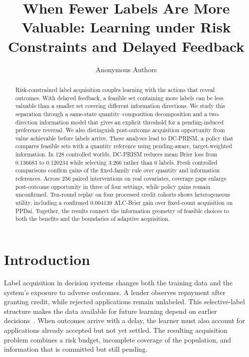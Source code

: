 \documentclass[runningheads]{llncs}
\begin{document}
\title{When Fewer Labels Are More Valuable: Learning under Risk Constraints and Delayed Feedback}
\author{Anonymous Authors}
\maketitle
\begin{abstract}
Risk-constrained label acquisition couples learning with the actions that reveal outcomes. With delayed feedback, a feasible set containing more labels can be less valuable than a smaller set covering different information directions. We study this separation through a same-state quantity--composition decomposition and a two-direction information model that gives an explicit threshold for a pending-induced preference reversal. We also distinguish post-outcome acquisition opportunity from value achievable before labels arrive. These analyses lead to DC-PRISM, a policy that compares feasible sets with a quantity reference using pending-aware, target-weighted information. In 128 controlled worlds, DC-PRISM reduces mean Brier loss from 0.136683 to 0.120234 while selecting 3.266 rather than 6 labels. Fresh controlled comparisons confirm gains of the fixed-family rule over quantity and information references. Across 256 paired interventions on real covariates, coverage gaps enlarge post-outcome opportunity in three of four settings, while policy gains remain unconfirmed. Ten-round replay on four processed credit cohorts shows heterogeneous utility, including a confirmed 0.004139 ALC-Brier gain over fixed-count acquisition on PPDai. Together, the results connect the information geometry of feasible choices to both the benefits and the boundaries of adaptive acquisition.
\end{abstract}
\section{Introduction}
\label{sec:intro}

Label acquisition in decision systems changes both the training data and the system's exposure to adverse outcomes. A lender observes repayment after granting credit, while rejected applications remain unlabeled. This selective-label structure makes the data available for future learning depend on earlier decisions~\cite{lakkaraju2017selective,wei2021selective}. When outcomes arrive with a delay, the learner must also account for applications already accepted but not yet settled. The resulting acquisition problem combines a risk budget, incomplete coverage of the population, and information that is committed but still pending.
\end{document}
